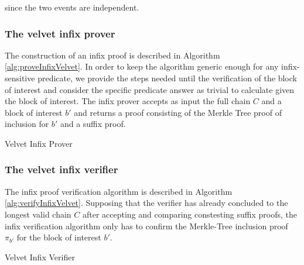 \documentclass[10pt,a4paper]{article}
\theoremstyle{plain}
\theoremstyle{definition}
\theoremstyle{lemma}
\begin{document}
since the two events are independent.

\subsubsection*{The velvet infix prover}
The construction of an infix proof is described in Algorithm \ref{alg:proveInfixVelvet}. In order
to keep the algorithm generic enough for any infix-sensitive predicate, we provide the steps
needed until the verification of the block of interest and consider the specific predicate answer
as trivial to calculate given the block of interest. The infix prover accepts as input the full
chain $C$ and a block of interest $b'$ and returns a proof consisting of the Merkle Tree proof
of inclusion for $b'$ and a suffix proof.
\vspace{4mm}

\begin{algorithm}[H]
\SetAlgoNoLine
\DontPrintSemicolon
{}
 \caption{Velvet Infix Prover}
 \label{alg:proveInfixVelvet}
\end{algorithm}

\vspace{4mm}

\subsubsection*{The velvet infix verifier}
The infix proof verification algorithm is described in Algorithm \ref{alg:verifyInfixVelvet}.
Supposing that the verifier has already concluded to the longest valid chain $C$ after accepting
and comparing constesting suffix proofs, the infix verification algorithm only has to confirm
the Merkle-Tree inclusion proof $\pi_{b'}$ for the block of interest $b'$.

\vspace{4mm}

\begin{algorithm}[H]
\SetAlgoNoLine
\DontPrintSemicolon
{}
 \caption{Velvet Infix Verifier}
 \label{alg:verifyInfixVelvet}
\end{algorithm}

\vspace{4mm}

\end{document}
